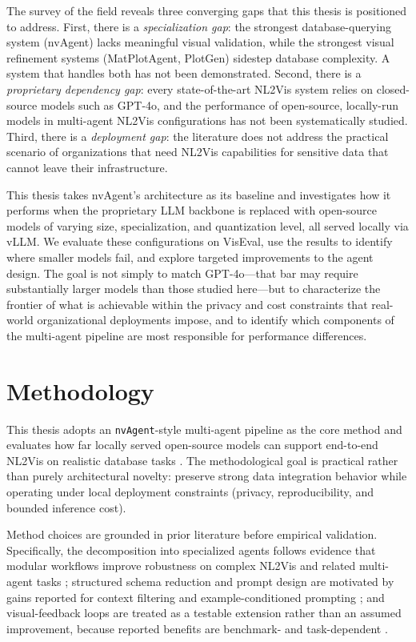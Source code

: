 \documentclass[a4paper,oneside,bibliography=totoc]{scrbook}
\begin{document}
The survey of the field reveals three converging gaps that this thesis is positioned to address. First, there is a \emph{specialization gap}: the strongest database-querying system (nvAgent) lacks meaningful visual validation, while the strongest visual refinement systems (MatPlotAgent, PlotGen) sidestep database complexity. A system that handles both has not been demonstrated. Second, there is a \emph{proprietary dependency gap}: every state-of-the-art NL2Vis system relies on closed-source models such as GPT-4o, and the performance of open-source, locally-run models in multi-agent NL2Vis configurations has not been systematically studied. Third, there is a \emph{deployment gap}: the literature does not address the practical scenario of organizations that need NL2Vis capabilities for sensitive data that cannot leave their infrastructure.

This thesis takes nvAgent's architecture as its baseline and investigates how it performs when the proprietary LLM backbone is replaced with open-source models of varying size, specialization, and quantization level, all served locally via vLLM. We evaluate these configurations on VisEval, use the results to identify where smaller models fail, and explore targeted improvements to the agent design. The goal is not simply to match GPT-4o---that bar may require substantially larger models than those studied here---but to characterize the frontier of what is achievable within the privacy and cost constraints that real-world organizational deployments impose, and to identify which components of the multi-agent pipeline are most responsible for performance differences.

\chapter{Methodology}

This thesis adopts an \texttt{nvAgent}-style multi-agent pipeline as the core method and evaluates how far locally served open-source models can support end-to-end NL2Vis on realistic database tasks \cite{ouyang2025nvagent}. The methodological goal is practical rather than purely architectural novelty: preserve strong data integration behavior while operating under local deployment constraints (privacy, reproducibility, and bounded inference cost).

Method choices are grounded in prior literature before empirical validation. Specifically, the decomposition into specialized agents follows evidence that modular workflows improve robustness on complex NL2Vis and related multi-agent tasks \cite{ouyang2025nvagent,li2024mas}; structured schema reduction and prompt design are motivated by gains reported for context filtering and example-conditioned prompting \cite{li2025prompt4vis,wu2024automated}; and visual-feedback loops are treated as a testable extension rather than an assumed improvement, because reported benefits are benchmark- and task-dependent \cite{yang2024matplotagent,shi2025visref}.
\end{document}
